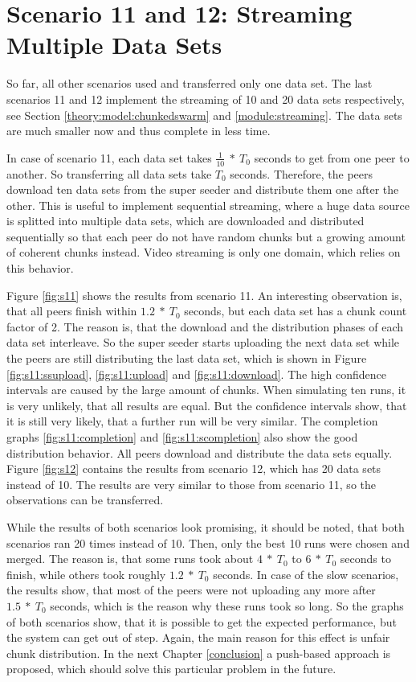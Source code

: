 \pagebreak
\section{Scenario 11 and 12: Streaming Multiple Data Sets}
\label{evaluation:1112}

So far, all other scenarios used and transferred only one data set. The last scenarios 11 and 12 implement the streaming of 10 and 20 data sets respectively, see Section \ref{theory:model:chunkedswarm} and \ref{module:streaming}. The data sets are much smaller now and thus complete in less time.

In case of scenario 11, each data set takes $\frac{1}{10}\:*\:T_0$ seconds to get from one peer to another. So transferring all data sets take $T_0$ seconds. Therefore, the peers download ten data sets from the super seeder and distribute them one after the other. This is useful to implement sequential streaming, where a huge data source is splitted into multiple data sets, which are downloaded and distributed sequentially so that each peer do not have random chunks but a growing amount of coherent chunks instead. Video streaming is only one domain, which relies on this behavior.

Figure \ref{fig:s11} shows the results from scenario 11. An interesting observation is, that all peers finish within $1.2\:*\:T_0$ seconds, but each data set has a chunk count factor of 2. The reason is, that the download and the distribution phases of each data set interleave. So the super seeder starts uploading the next data set while the peers are still distributing the last data set, which is shown in Figure \ref{fig:s11:ssupload}, \ref{fig:s11:upload} and \ref{fig:s11:download}. The high confidence intervals are caused by the large amount of chunks. When simulating ten runs, it is very unlikely, that all results are equal. But the confidence intervals show, that it is still very likely, that a further run will be very similar. The completion graphs \ref{fig:s11:completion} and \ref{fig:s11:scompletion} also show the good distribution behavior. All peers download and distribute the data sets equally. Figure \ref{fig:s12} contains the results from scenario 12, which has 20 data sets instead of 10. The results are very similar to those from scenario 11, so the observations can be transferred.

While the results of both scenarios look promising, it should be noted, that both scenarios ran 20 times instead of 10. Then, only the best 10 runs were chosen and merged. The reason is, that some runs took about $4\:*\:T_0$ to $6\:*\:T_0$ seconds to finish, while others took roughly $1.2\:*\:T_0$ seconds. In case of the slow scenarios, the results show, that most of the peers were not uploading any more after $1.5\:*\:T_0$ seconds, which is the reason why these runs took so long. So the graphs of both scenarios show, that it is possible to get the expected performance, but the system can get out of step. Again, the main reason for this effect is unfair chunk distribution. In the next Chapter \ref{conclusion} a push-based approach is proposed, which should solve this particular problem in the future.
